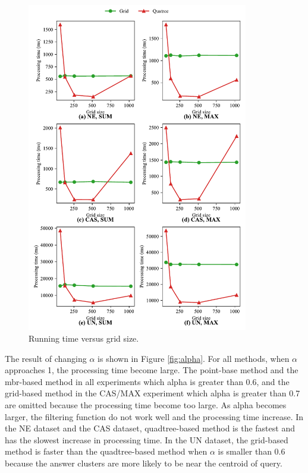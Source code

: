 \documentclass[a4paper,11pt]{report}
\theoremstyle{mytheoremstyle}
\begin{document}
\begin{figure}
    \begin{center}
        \includegraphics[width=0.86\textwidth]{matplotlib/export/gridsize.pdf}
    \end{center}
    \caption{Running time versus grid size.}
    \label{fig:gridSize}
\end{figure}

The result of changing $\alpha$ is shown in Figure \ref{fig:alpha}. For all methods, when $\alpha$ approaches 1, the processing time become large. The point-base method and the mbr-based method in all experiments which alpha is greater than 0.6, and the grid-based method in the CAS/MAX experiment which alpha is greater than 0.7 are omitted because the processing time become too large. As alpha becomes larger, the filtering function do not work well and the processing time increase. In the NE dataset and the CAS dataset, quadtree-based method is the fastest and has the slowest increase in processing time. In the UN dataset, the grid-based method is faster than the quadtree-based method when $\alpha$ is smaller than 0.6 because the answer clusters are more likely to be near the centroid of query.
\end{document}
